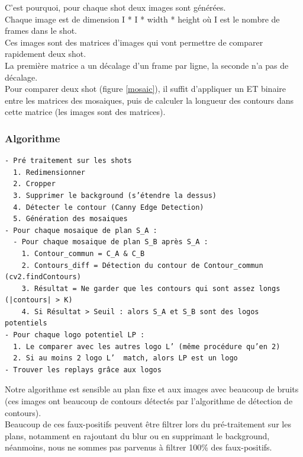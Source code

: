 \documentclass[11pt]{article}
\begin{document}
C'est pourquoi, pour chaque shot deux images sont générées.\\

Chaque image est de dimension I * I * width * height où I est le nombre de frames dans le shot.\\

Ces images sont des matrices d'images qui vont permettre de comparer rapidement deux shot.\\
La première matrice a un décalage d'un frame par ligne, la seconde n'a pas de décalage.\\

Pour comparer deux shot (figure \ref{mosaic}), il suffit d’appliquer un ET binaire entre les matrices des mosaiques, puis de calculer la longueur des contours dans cette matrice (les images sont des matrices).\\

\subsubsection{Algorithme}
\label{sec:orgc06b6b2}
\begin{verbatim}
- Pré traitement sur les shots
  1. Redimensionner
  2. Cropper
  3. Supprimer le background (s’étendre la dessus)
  4. Détecter le contour (Canny Edge Detection)
  5. Génération des mosaiques
- Pour chaque mosaique de plan S_A :
  - Pour chaque mosaique de plan S_B après S_A :
    1. Contour_commun = C_A & C_B
    2. Contours_diff = Détection du contour de Contour_commun (cv2.findContours)
    3. Résultat = Ne garder que les contours qui sont assez longs (|contours| > K)
    4. Si Résultat > Seuil : alors S_A et S_B sont des logos potentiels
- Pour chaque logo potentiel LP :
  1. Le comparer avec les autres logo L’ (même procédure qu’en 2)
  2. Si au moins 2 logo L’  match, alors LP est un logo
- Trouver les replays grâce aux logos
\end{verbatim}

Notre algorithme est sensible au plan fixe et aux images avec beaucoup de bruits (ces images ont beaucoup de contours détectés par l’algorithme de détection de contours).\\
Beaucoup de ces faux-positifs peuvent être filtrer lors du pré-traitement sur les plans, notamment en rajoutant du blur ou en supprimant le background, néanmoins, nous ne sommes pas parvenus à filtrer 100\% des faux-positifs.\\
\end{document}
